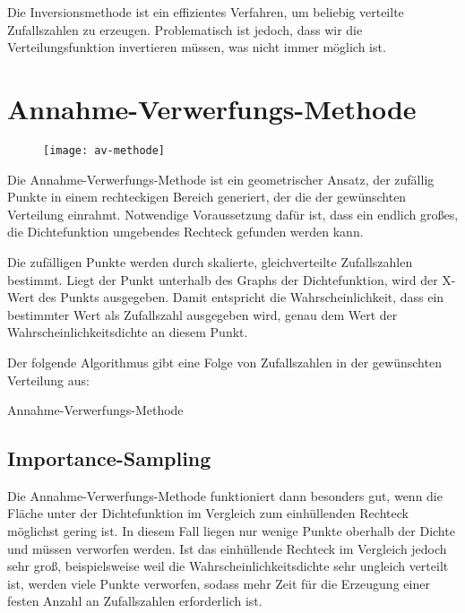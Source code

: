 Die Inversionsmethode ist ein effizientes Verfahren, um beliebig verteilte
Zufallszahlen zu erzeugen. Problematisch ist jedoch, dass wir die
Verteilungsfunktion invertieren müssen, was nicht immer möglich ist.

\section{Annahme-Verwerfungs-Methode}

\begin{wrapfigure}{r}{0.5\textwidth}
\centering
\texttt{[image: av-methode]}
\end{wrapfigure}
Die Annahme-Verwerfungs-Methode ist ein geometrischer Ansatz, der zufällig
Punkte in einem rechteckigen Bereich generiert, der die
 der gewünschten Verteilung einrahmt.
Notwendige Voraussetzung dafür ist, dass ein endlich großes, die Dichtefunktion
umgebendes Rechteck gefunden werden kann.

Die zufälligen Punkte werden durch skalierte, gleichverteilte Zufallszahlen
bestimmt. Liegt der Punkt unterhalb des Graphs der Dichtefunktion, wird der
X-Wert des Punkts ausgegeben. Damit entspricht die Wahrscheinlichkeit, dass ein
bestimmter Wert als Zufallszahl ausgegeben wird, genau dem Wert der
Wahrscheinlichkeitsdichte an diesem Punkt.

Der folgende Algorithmus gibt eine Folge von Zufallszahlen in der gewünschten
Verteilung aus:

\begin{algorithm}[h!]
\DontPrintSemicolon
\LinesNumbered


\caption{Annahme-Verwerfungs-Methode}\label{algo:av-methode}
\end{algorithm}

\subsection{Importance-Sampling}

Die Annahme-Verwerfungs-Methode funktioniert dann besonders gut, wenn die Fläche
unter der Dichtefunktion im Vergleich zum einhüllenden Rechteck möglichst gering
ist. In diesem Fall liegen nur wenige Punkte oberhalb der Dichte und müssen
verworfen werden. Ist das einhüllende Rechteck im Vergleich jedoch sehr groß,
beispielsweise weil die Wahrscheinlichkeitsdichte sehr ungleich verteilt ist,
werden viele Punkte verworfen, sodass mehr Zeit für die Erzeugung einer festen
Anzahl an Zufallszahlen erforderlich ist.


